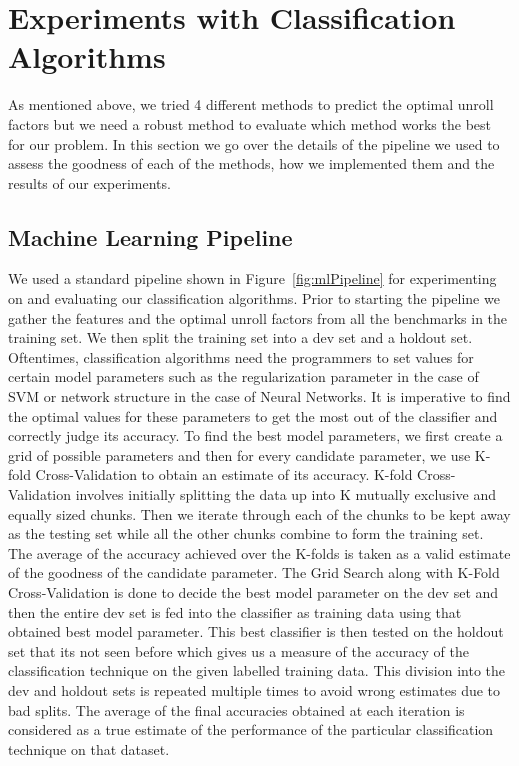 \documentclass[]{sig-alternate}
\begin{document}
\section{Experiments with Classification Algorithms}
\label{sec:ExperimentsClassification}

As mentioned above, we tried 4 different methods to predict the optimal unroll factors but we need a robust method to evaluate which method works the best for our problem. In this section we go over the details of the pipeline we used to assess the goodness of each of the methods, how we implemented them and the results of our experiments. 

\subsection{Machine Learning Pipeline}
\label{subsec:MachineLearningPipeline}

We used a standard pipeline shown in Figure~\ref{fig:mlPipeline} for experimenting on and evaluating our classification algorithms. Prior to starting the pipeline we gather the features and the optimal unroll factors from all the benchmarks in the training set. We then split the training set into a dev set and a holdout set. Oftentimes, classification algorithms need the programmers to set values for certain model parameters such as the regularization parameter in the case of SVM or network structure in the case of Neural Networks. It is imperative to find the optimal values for these parameters to get the most out of the classifier and correctly judge its accuracy. To find the best model parameters, we first create a grid of possible parameters and then for every candidate parameter, we use K-fold Cross-Validation to obtain an estimate of its accuracy. K-fold Cross-Validation involves initially splitting the data up into K mutually exclusive and equally sized chunks. Then we iterate through each of the chunks to be kept away as the testing set while all the other chunks combine to form the training set. The average of the accuracy achieved over the K-folds is taken as a valid estimate of the goodness of the candidate parameter. The Grid Search along with K-Fold Cross-Validation is done to decide the best model parameter on the dev set and then the entire dev set is fed into the classifier as training data using that obtained best model parameter. This best classifier is then tested on the holdout set that its not seen before which gives us a measure of the accuracy of the classification technique on the given labelled training data. This division into the dev and holdout sets is repeated multiple times to avoid wrong estimates due to bad splits. The average of the final accuracies obtained at each iteration is considered as a true estimate of the performance of the particular classification technique on that dataset. 
\end{document}
